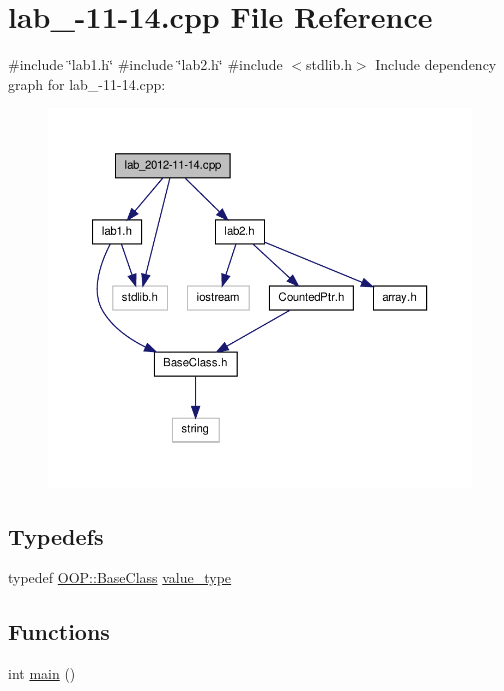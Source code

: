 \hypertarget{lab__2012-11-14_8cpp}{\section{lab\-\_-\/11-\/14.cpp \-File \-Reference}
\label{lab__2012-11-14_8cpp}
}
{\ttfamily \#include \char`\"{}lab1.\-h\char`\"{}}\*
{\ttfamily \#include \char`\"{}lab2.\-h\char`\"{}}\*
{\ttfamily \#include $<$stdlib.\-h$>$}\*
\-Include dependency graph for lab\-\_-\/11-\/14.cpp\-:\nopagebreak
\begin{figure}[H]
\begin{center}
\leavevmode
\includegraphics[width=350pt]{lab__2012-11-14_8cpp__incl}
\end{center}
\end{figure}
\subsection*{\-Typedefs}
\begin{DoxyCompactItemize}
\item 
typedef \hyperlink{classOOP_1_1BaseClass}{\-O\-O\-P\-::\-Base\-Class} \hyperlink{lab__2012-11-14_8cpp_a1ebf4c1886eac7249b0dce3557d4a720}{value\-\_\-type}
\end{DoxyCompactItemize}
\subsection*{\-Functions}
\begin{DoxyCompactItemize}
\item 
int \hyperlink{lab__2012-11-14_8cpp_ae66f6b31b5ad750f1fe042a706a4e3d4}{main} ()
\end{DoxyCompactItemize}


